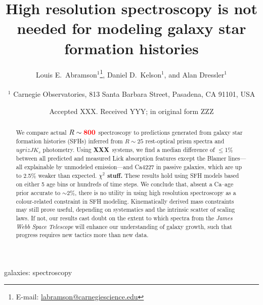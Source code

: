 \documentclass[a4paper,fleqn,usenatbib]{mnras}
\title[More is not better]{High resolution spectroscopy is not needed for modeling
					galaxy star formation histories}
\author[Abramson, Kelson, \& Dressler]{Louis E.~Abramson$^{1}$\thanks{E-mail: \href{mailto:labramson@carnegiescience.edu}{labramson@carnegiescience.edu}},
Daniel D.~Kelson$^{1}$,
and Alan Dressler$^{1}$
\\
\\
$^1$	Carnegie Observatories, 813 Santa Barbara Street, Pasadena, CA 91101, USA\\
}
\date{Accepted XXX. Received YYY; in original form ZZZ}
\newcommand{\Mstel}{M_\ast}
\newcommand{\bfr}{\bf\color{red}}
\newcommand{\ntot}{{\bfr XXX}} %
\begin{document}
\label{firstpage}
\pagerange{\pageref{firstpage}--\pageref{lastpage}}
\maketitle

\begin{abstract}

	We compare actual $R\sim{\bfr 800}$ spectroscopy to predictions generated from galaxy 
	star formation histories (SFHs) inferred from $R\sim25$ rest-optical prism spectra 
	and $ugrizJK_{s}$ photometry. Using \ntot\ systems, we find a median difference of 
	$\leq$1\% between all predicted and measured Lick absorption features except the Blamer 
	lines---all explainable by unmodeled emission---and Ca4227 in passive galaxies, 
	which are up to 2.5\% weaker than expected. {\bfr $\chi^{2}$ stuff.}
	These results hold using SFH models based on either 5 age bins or hundreds of time steps. 
	We conclude that, absent a Ca--age prior accurate to $\sim$2\%, there is no utility in using 
	high resolution spectroscopy as a colour-related constraint in SFH modeling. 
	Kinematically derived mass constraints may still prove useful, depending on systematics
	and the intrinsic scatter of scaling laws. If not, our results cast doubt on the extent to which 
	spectra from the {\it James Webb Space Telescope} will enhance our understanding of 
	galaxy growth, such that progress requires new tactics more than new data.

\end{abstract}

\begin{keywords}
	galaxies: spectroscopy
\end{keywords}


\end{document}
